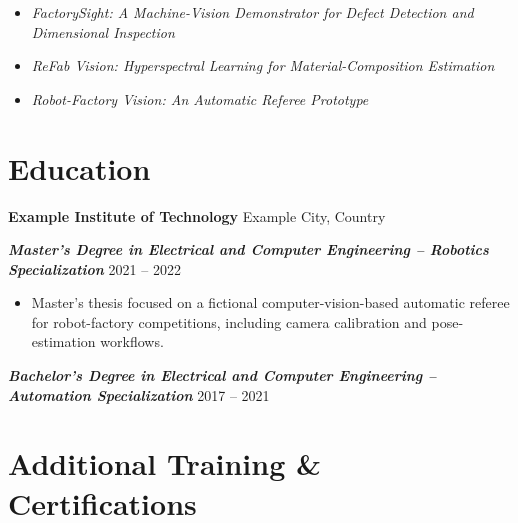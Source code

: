 \documentclass[11pt,a4paper]{article}
\begin{document}
\begin{itemize}

\item \textit{FactorySight: A Machine-Vision Demonstrator for Defect Detection and Dimensional Inspection}

\item \textit{ReFab Vision: Hyperspectral Learning for Material-Composition Estimation}

\item \textit{Robot-Factory Vision: An Automatic Referee Prototype}

\end{itemize}


\section*{\Large Education}

\textbf{Example Institute of Technology}
\hfill Example City, Country

{\small\textbf{\textit{Master's Degree in Electrical and Computer Engineering -- Robotics Specialization}}
\hfill 2021 -- 2022}

\begin{itemize}

\item Master's thesis focused on a fictional computer-vision-based automatic referee for robot-factory competitions, including camera calibration and pose-estimation workflows.

\end{itemize}

\vspace{0.3em}

{\small\textbf{\textit{Bachelor's Degree in Electrical and Computer Engineering -- Automation Specialization}}
\hfill 2017 -- 2021}


\section*{\Large Additional Training \& Certifications}
\end{document}
